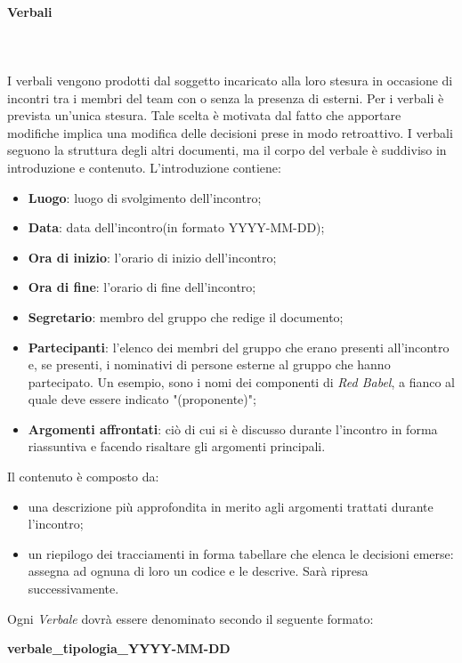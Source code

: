 		\paragraph{Verbali} \mbox{}\\ \mbox{}\\
		I verbali vengono prodotti dal soggetto incaricato alla loro stesura in occasione di incontri tra i membri del team con o senza la presenza di esterni. Per i verbali è prevista un'unica stesura. Tale	scelta è motivata dal fatto che apportare modifiche implica una modifica delle decisioni prese in modo retroattivo.
		I verbali seguono la struttura degli altri documenti, ma il corpo del verbale è suddiviso in introduzione e contenuto.
		L'introduzione contiene:
		\begin{itemize}
			\item \textbf{Luogo}: luogo di svolgimento dell'incontro;
			\item \textbf{Data}: data dell'incontro(in formato YYYY-MM-DD);
			\item \textbf{Ora di inizio}: l'orario di inizio dell'incontro;
			\item \textbf{Ora di fine}: l'orario di fine dell'incontro;
			\item \textbf{Segretario}: membro del gruppo che redige il documento;
			\item \textbf{Partecipanti}: l'elenco dei membri del gruppo che erano presenti all'incontro e, se presenti, i nominativi di persone esterne al gruppo che hanno partecipato. Un esempio, sono i nomi dei componenti di \textit{Red Babel}, a fianco al quale deve essere indicato "(proponente)";
			\item \textbf{Argomenti affrontati}: ciò di cui si è discusso durante l'incontro in forma riassuntiva e facendo risaltare gli argomenti principali.
		\end{itemize}
	Il contenuto è composto da:
	\begin{itemize}
		\item una descrizione più approfondita in merito agli argomenti trattati durante l'incontro;
		\item un riepilogo dei tracciamenti in forma tabellare che elenca le decisioni emerse: assegna ad ognuna di loro un codice e le descrive. Sarà ripresa successivamente.
	\end{itemize}
		Ogni \textit{Verbale} dovrà essere denominato secondo il seguente formato: \newline \newline
		\centerline{\textbf{verbale\_tipologia\_YYYY-MM-DD}} \newline \newline
